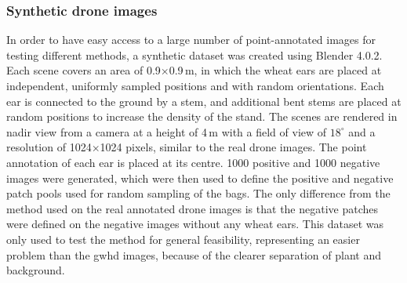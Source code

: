 \documentclass[12pt,parskip = half, DIV=classic,listof=totoc]{scrartcl}
\begin{document}
			\subsubsection{Synthetic drone images}\label{sec:data_synth}
				In order to have easy access to a large number of point-annotated images for testing different methods, 
				a synthetic dataset was created using Blender 4.0.2. Each scene covers an area of 0.9$\times$0.9\,m, in 
				which the wheat ears are placed at independent, uniformly sampled positions and with random orientations. 
				Each ear is connected to the ground by a stem, and additional bent stems 
				are placed at random positions to increase the density of the stand. The scenes are rendered in nadir view 
				from a camera at a height of 4\,m with a field of view of $18^\circ$ and a resolution of 1024$\times$1024 
				pixels, similar to the real drone images.
				The point annotation of each ear is placed at its centre. 
				1000 positive and 1000 negative images were generated, which were then used to define the positive and 
				negative patch pools used for random sampling of the bags. The only difference from the method used on the 
				real annotated drone images is that the negative patches were defined on the negative images without any 
				wheat ears. This dataset was only used to test the method for general feasibility, representing an easier 
				problem than the \ac{gwhd} images, because of the clearer separation of plant and background.
		
\end{document}
